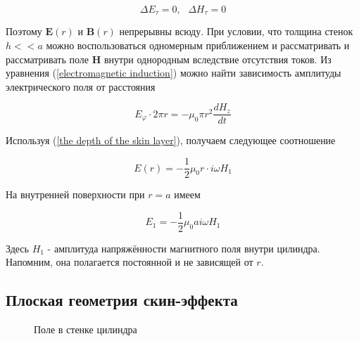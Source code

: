 \documentclass[a4paper, 12pt]{article} %
\begin{document}
\[ \Delta E_\tau = 0, \text{    } \Delta H_\tau = 0\]

Поэтому $\mathbf{E}(r) \text{ и } \mathbf{B} (r)$ непрерывны всюду. При условии, что толщина стенок $h << a$ можно воспользоваться одномерным приближением и рассматривать и рассматривать поле $\mathbf{H}$ внутри однородным вследствие отсутствия токов. Из уравнения (\ref{electromagnetic induction}) можно найти зависимость амплитуды электрического поля от расстояния

\[ E_\varphi \cdot 2\pi r = - \mu_0 \pi r^2 \frac{d H_z}{d t}\]

Используя (\ref{the depth of the skin layer}), получаем следующее соотношение

\[ E(r) = - \frac{1}{2} \mu_0 r \cdot i \omega H_1\]

На внутренней поверхности при $r = a$ имеем 

\begin{equation}
    E_1 = - \frac{1}{2} \mu_0 a i \omega H_1
    \label{function E_1 expession}
\end{equation}

Здесь $H_1$ - амплитуда напряжённости магнитного поля внутри цилиндра. Напомним, она полагается постоянной и не зависящей от $r$.

\subsection{Плоская геометрия скин-эффекта}

\begin{figure}[h!]
    \centering
\caption{Поле в стенке цилиндра} 
\label{electromagnetic field}
\end{figure}
\end{document}
